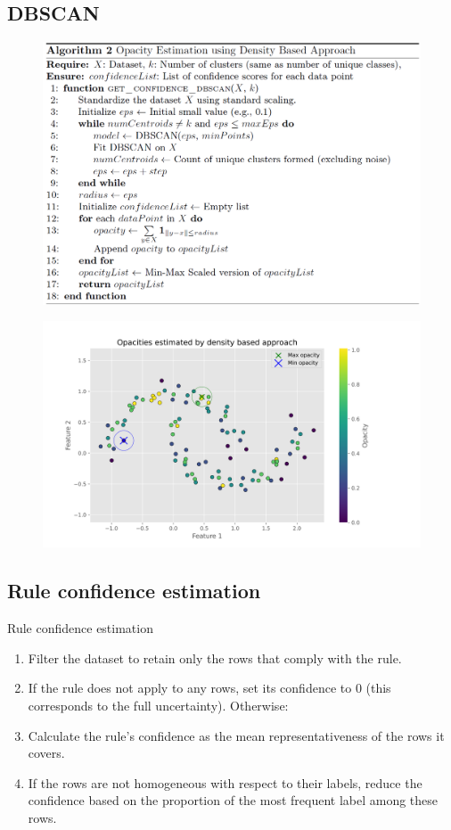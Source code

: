 \documentclass[aspectratio=169]{beamer}
\begin{document}
\subsection{DBSCAN}
\begin{frame}
\begin{figure}
    \centering
    \includegraphics[width=0.75\linewidth]{../../fig/alg_dbscan_opacity.png}
    \label{fig:alg_dbscan}
\end{figure}
\end{frame}

\begin{frame}
\begin{figure}
    \centering
    \includegraphics[width=0.75\linewidth]{../../fig/denisty_opactiy.png}
    \label{fig:density_opacity}
\end{figure}
\end{frame}

\subsection{Rule confidence estimation}
\begin{frame}{Rule confidence estimation}
\begin{enumerate}
    \item Filter the dataset to retain only the rows that comply with the rule. \pause
    \item If the rule does not apply to any rows, set its confidence to 0 (this corresponds to the full uncertainty). Otherwise: \pause
    \item Calculate the rule's confidence as the mean representativeness of the rows it covers. \pause
    \item If the rows are not homogeneous with respect to their labels, reduce the confidence based on the proportion of the most frequent label among these rows.
\end{enumerate} 
\end{frame}
\end{document}
